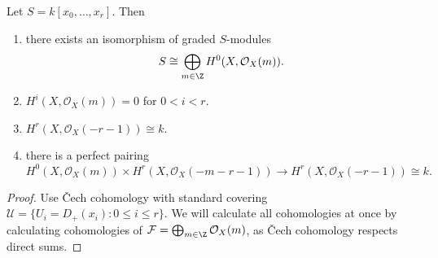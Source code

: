 \documentclass[a4paper]{article}
\newcommand{\sh}[1]{\mathcal{#1}} %
\begin{document}
\begin{theorem}
  Let \(S = k[x_0, \dots, x_r]\). Then
  \begin{enumerate}
  \item there exists an isomorphism of graded \(S\)-modules
    \[
      S \cong \bigoplus_{m \in \Z} H^0(X, \sh O_X(m)).
    \]
  \item \(H^i(X, \sh O_X(m)) = 0\) for \(0 < i < r\).
  \item \(H^r(X, \sh O_X(-r - 1)) \cong k\).
  \item there is a perfect pairing
    \[
      H^0(X, \sh O_X(m)) \times H^r(X, \sh O_X(-m - r - 1)) \to H^r(X, \sh O_X(-r - 1)) \cong k.
    \]
  \end{enumerate}
\end{theorem}

\begin{proof}
  Use Čech cohomology with standard covering \(\mathcal U = \{U_i = D_+(x_i): 0 \leq i \leq r\}\). We will calculate all cohomologies at once by calculating cohomologies of \(\sh F = \bigoplus_{m \in \Z} \sh O_X(m)\), as Čech cohomology respects direct sums.


\end{proof}
\end{document}
